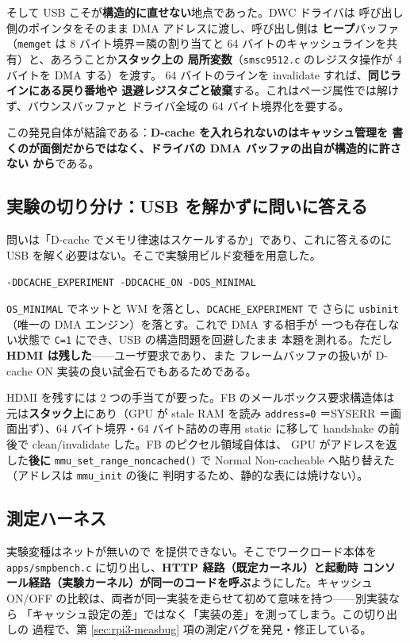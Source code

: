 そして USB こそが\textbf{構造的に直せない}地点であった。DWC ドライバは
呼び出し側のポインタをそのまま DMA アドレスに渡し、呼び出し側は
\textbf{ヒープ}バッファ（\texttt{memget} は 8 バイト境界＝隣の割り当てと
64 バイトのキャッシュラインを共有）と、あろうことか\textbf{スタック上の
局所変数}（\texttt{smsc9512.c} のレジスタ操作が 4 バイトを DMA する）を渡す。
64 バイトのラインを invalidate すれば、\textbf{同じラインにある戻り番地や
退避レジスタごと破棄}する。これはページ属性では解けず、バウンスバッファと
ドライバ全域の 64 バイト境界化を要する。

この発見自体が結論である：\textbf{D-cache を入れられないのはキャッシュ管理を
書くのが面倒だからではなく、ドライバの DMA バッファの出自が構造的に許さない
から}である。

\subsection{実験の切り分け：USB を解かずに問いに答える}

問いは「D-cache でメモリ律速はスケールするか」であり、これに答えるのに
USB を解く必要はない。そこで実験用ビルド変種を用意した。

\begin{center}
\texttt{-DDCACHE\_EXPERIMENT -DDCACHE\_ON -DOS\_MINIMAL}
\end{center}

\noindent
\texttt{OS\_MINIMAL} でネットと WM を落とし、\texttt{DCACHE\_EXPERIMENT} で
さらに \texttt{usbinit}（唯一の DMA エンジン）を落とす。これで DMA する相手が
一つも存在しない状態で \texttt{C=1} にでき、USB の構造問題を回避したまま
本題を測れる。ただし\textbf{HDMI は残した}——ユーザ要求であり、また
フレームバッファの扱いが D-cache ON 実装の良い試金石でもあるためである。

HDMI を残すには 2 つの手当てが要った。FB のメールボックス要求構造体は
元は\textbf{スタック上}にあり（GPU が stale RAM を読み \texttt{address=0}
＝SYSERR ＝画面出ず）、64 バイト境界・64 バイト詰めの専用 static に移して
handshake の前後で clean/invalidate した。FB のピクセル領域自体は、
GPU がアドレスを返した\textbf{後に} \texttt{mmu\_set\_range\_noncached()} で
Normal Non-cacheable へ貼り替えた（アドレスは \texttt{mmu\_init} の後に
判明するため、静的な表には焼けない）。

\subsection{測定ハーネス}

実験変種はネットが無いので  を提供できない。そこでワークロード本体を
\texttt{apps/smpbench.c} に切り出し、\textbf{HTTP 経路（既定カーネル）と起動時
コンソール経路（実験カーネル）が同一のコードを呼ぶ}ようにした。キャッシュ
ON/OFF の比較は、両者が同一実装を走らせて初めて意味を持つ——別実装なら
「キャッシュ設定の差」ではなく「実装の差」を測ってしまう。この切り出しの
過程で、第 \ref{sec:rpi3-measbug} 項の測定バグを発見・修正している。

